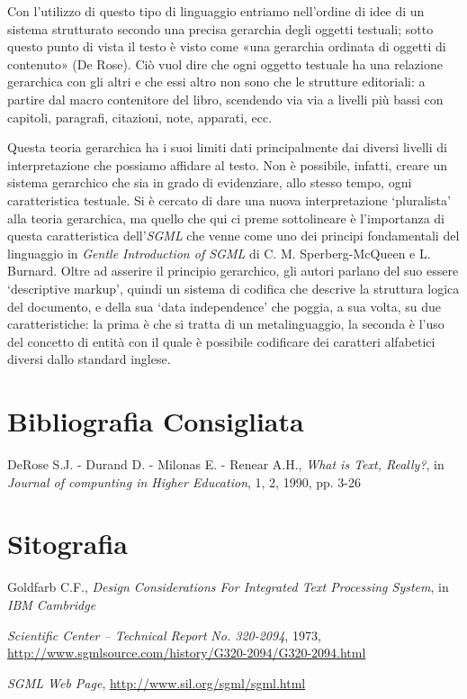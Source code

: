 Con l'utilizzo di questo tipo di linguaggio entriamo nell'ordine di idee
di un sistema strutturato secondo una precisa gerarchia degli oggetti
testuali; sotto questo punto di vista il testo è visto come «una
gerarchia ordinata di oggetti di contenuto» (De Rose). Ciò vuol dire che
ogni oggetto testuale ha una relazione gerarchica con gli altri e che
essi altro non sono che le strutture editoriali: a partire dal macro
contenitore del libro, scendendo via via a livelli più bassi con
capitoli, paragrafi, citazioni, note, apparati, ecc.

Questa teoria gerarchica ha i suoi limiti dati principalmente dai
diversi livelli di interpretazione che possiamo affidare al testo. Non è
possibile, infatti, creare un sistema gerarchico che sia in grado di
evidenziare, allo stesso tempo, ogni caratteristica testuale. Si è
cercato di dare una nuova interpretazione `pluralista' alla teoria
gerarchica, ma quello che qui ci preme sottolineare è l'importanza di
questa caratteristica dell'\emph{SGML} che venne come uno dei principi
fondamentali del linguaggio in \emph{Gentle Introduction of SGML} di C.
M. Sperberg-McQueen e L. Burnard. Oltre ad asserire il principio
gerarchico, gli autori parlano del suo essere `descriptive markup',
quindi un sistema di codifica che descrive la struttura logica del
documento, e della sua `data independence' che poggia, a sua volta, su
due caratteristiche: la prima è che si tratta di un metalinguaggio, la
seconda è l'uso del concetto di entità con il quale è possibile
codificare dei caratteri alfabetici diversi dallo standard inglese.

\section*{Bibliografia Consigliata}
{\parindent0pt 
DeRose S.J. - Durand D. - Milonas E. - Renear A.H., \emph{What is Text,
Really?}, in \emph{Journal of compunting in Higher Education}, 1, 2,
1990, pp. 3-26
}

\section*{Sitografia}
{\parindent0pt 
Goldfarb C.F., \emph{Design Considerations For Integrated Text
Processing System}, in \emph{IBM Cambridge }

\emph{Scientific Center -- Technical Report} \emph{No. 320-2094}, 1973,
\url{http://www.sgmlsource.com/history/G320-2094/G320-2094.html}


\emph{SGML Web Page},
\url{http://www.sil.org/sgml/sgml.html}
}


